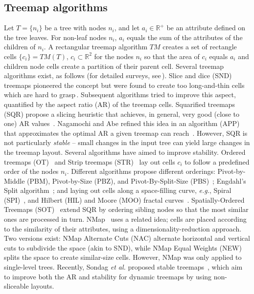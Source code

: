 \subsection{Treemap algorithms}
%
%
Let $T=\{n_i\}$ be a tree with nodes $n_i$, and let $a_i \in \mathbb{R}^{+}$ be an attribute defined on the tree leaves. For non-leaf nodes $n_i$, $a_i$ equals the sum of the attributes of the children of $n_i$. A rectangular treemap algorithm $TM$ creates a set of rectangle cells $\{c_i\} = TM(T)$, $c_i \subset \mathbb{R}^2$ for the nodes $n_i$ so that the area of $c_i$ equals $a_i$ and children node cells create a partition of their parent cell. Several treemap algorithms exist, as follows (for detailed surveys, see\,\cite{schulz11_treesurvey,hci_treemaps,treevis,landesberger11}). Slice and dice (SND) treemaps pioneered the concept but were found to create too long-and-thin cells which are hard to grasp\,\citep{shneiderman92}. Subsequent algorithms tried to improve this aspect, quantified by the aspect ratio (AR) of the treemap cells. Squarified treemaps (SQR) propose a slicing heuristic that achieves, in general, very good (close to one) AR values~\citep{sqr}. Nagamochi and Abe refined this idea in an algorithm (APP) that approximates the optimal AR a given treemap can reach~\citep{nagamochi07}. However, SQR is not particularly \emph{stable} -- small changes in the input tree can yield large changes in the treemap layout. Several algorithms have aimed to improve stability. Ordered treemaps (OT)~\citep{ordered} and Strip treemaps (STR)~\citep{bederson02} lay out cells $c_i$ to follow a predefined order of the nodes $n_i$. Different algorithms propose different orderings: Pivot-by-Middle (PBM), Pivot-by-Size (PBZ), and Pivot-By-Split-Size (PBS)~\citep{ordered}; Engdahl's Split algorithm~\citep{engdahl}; and laying out cells along a space-filling curve, \emph{e.g.}, Spiral (SPI)~\citep{spiral}, and Hilbert (HIL) and Moore (MOO) fractal curves~\citep{hilbert_moore}. Spatially-Ordered Treemaps (SOT)~\citep{sot} extend SQR by ordering sibling nodes so that the most similar ones are processed in turn. NMap~\citep{nmap} uses a related idea; cells are placed according to the similarity of their attributes, using a dimensionality-reduction approach. Two versions exist: NMap Alternate Cuts (NAC) alternate horizontal and vertical cuts to subdivide the space (akin to SND), while NMap Equal Weights (NEW) splits the space to create similar-size cells. However, NMap was only applied to single-level trees. Recently, Sondag \emph{et al.} proposed stable treemaps~\citep{sondag17}, which aim to improve both the AR and stability for dynamic treemaps by using non-sliceable layouts.

